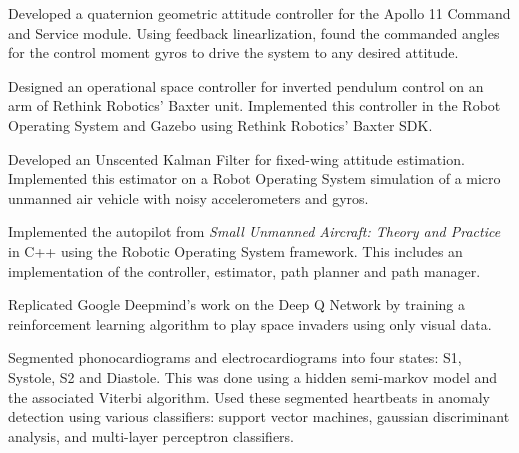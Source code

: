 

\begin{cvparagraph}
Developed a quaternion geometric attitude controller for the Apollo 11 Command and Service module. Using feedback linearlization, found the commanded angles for the control moment gyros to drive the system to any desired attitude.
\end{cvparagraph}

\begin{cvparagraph}
Designed an operational space controller for inverted pendulum control on an arm of Rethink Robotics' Baxter unit. Implemented this controller in the Robot Operating System and Gazebo using Rethink Robotics' Baxter SDK.
\end{cvparagraph}

\begin{cvparagraph}
Developed an Unscented Kalman Filter for fixed-wing attitude estimation. Implemented this estimator on a Robot Operating System simulation of a micro unmanned air vehicle with noisy accelerometers and gyros.
\end{cvparagraph}

\begin{cvparagraph}
  Implemented the autopilot from \textit{Small Unmanned Aircraft: Theory and Practice} in C++ using the Robotic Operating System framework. This includes an implementation of the controller, estimator, path planner and path manager.
\end{cvparagraph}

\begin{cvparagraph}
  Replicated Google Deepmind's work on the Deep Q Network by training a reinforcement learning algorithm to play space invaders using only visual data.
\end{cvparagraph}

\begin{cvparagraph}
  Segmented phonocardiograms and electrocardiograms into four states: S1, Systole, S2 and Diastole. This was done using a hidden semi-markov model and the associated Viterbi algorithm. Used these segmented heartbeats in anomaly detection using various classifiers: support vector machines, gaussian discriminant analysis, and multi-layer perceptron classifiers.
\end{cvparagraph}
